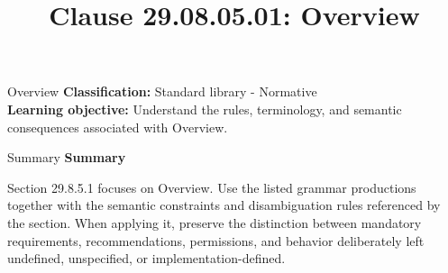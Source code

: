 \documentclass[10pt,letterpaper]{article}
\title{Clause 29.08.05.01: Overview}
\author{}
\date{}
\begin{document}
\maketitle
\begin{CornellOverviewBox}{Overview}
\textbf{Classification:} Standard library - Normative\\[2pt]
\textbf{Learning objective:} Understand the rules, terminology, and semantic consequences associated with Overview.
\end{CornellOverviewBox}\begin{CornellSummaryBox}{Summary}
{\sffamily\bfseries\color{Accent} Summary}\par\vspace{3pt}Section 29.8.5.1 focuses on Overview. Use the listed grammar productions together with the semantic constraints and disambiguation rules referenced by the section. When applying it, preserve the distinction between mandatory requirements, recommendations, permissions, and behavior deliberately left undefined, unspecified, or implementation-defined.
\end{CornellSummaryBox}
\end{document}
